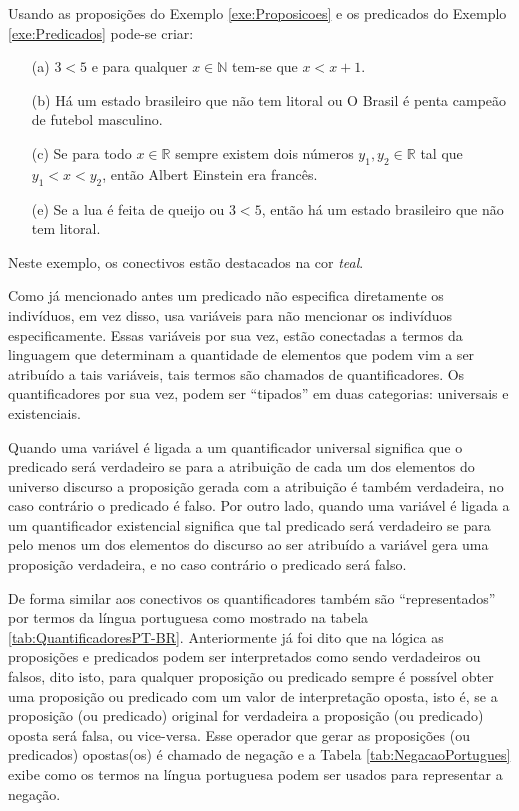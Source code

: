 \begin{exemplo}\label{exe:Conectivos}
	Usando as proposições do Exemplo \ref{exe:Proposicoes} e os predicados do Exemplo \ref{exe:Predicados} pode-se criar:
	\begin{itemize}
		\item[(a)] $3 < 5$ {\color{teal}e} para qualquer $x \in\mathbb{N}$ tem-se que $x < x + 1$.
		\item[(b)] Há um estado brasileiro que não tem litoral {\color{teal}ou} O Brasil é penta campeão de futebol masculino.
		\item[(c)] {\color{teal}Se} para todo $x \in \mathbb{R}$ sempre existem dois números $y_1, y_2 \in \mathbb{R}$ tal que $y_1 < x < y_2$, {\color{teal}então} Albert Einstein era francês.
		\item[(e)] {\color{teal}Se} a lua é feita de queijo {\color{teal}ou} $3 < 5$, {\color{teal}então} há um estado brasileiro que não tem litoral.
	\end{itemize}
	Neste exemplo, os conectivos estão destacados na cor \textit{{\color{teal} teal}}.
\end{exemplo}

Como já mencionado antes um predicado não especifica diretamente os indivíduos, em vez disso, usa variáveis para não mencionar os indivíduos especificamente. Essas variáveis por sua vez, estão conectadas a termos da linguagem que determinam a quantidade de elementos que podem vim a ser atribuído a tais variáveis, tais termos são chamados de quantificadores. Os quantificadores por sua vez, podem ser ``tipados'' em duas categorias: universais e existenciais.

Quando uma variável é ligada a um quantificador universal significa que o predicado será verdadeiro se para a atribuição de cada um dos elementos do universo discurso a proposição gerada com a atribuição é também verdadeira, no caso contrário o predicado é falso. Por outro lado, quando uma variável é ligada a um quantificador existencial significa que tal predicado será verdadeiro se para pelo menos um dos elementos do discurso ao ser atribuído a variável gera uma proposição verdadeira, e no caso contrário o predicado será falso.

De forma similar aos conectivos os quantificadores também são ``representados'' por termos da língua portuguesa como mostrado na tabela \ref{tab:QuantificadoresPT-BR}. Anteriormente já foi dito que na lógica as proposições e predicados podem ser interpretados como sendo verdadeiros ou falsos, dito isto, para qualquer proposição ou predicado sempre é possível obter uma proposição ou predicado com um valor de interpretação oposta, isto é, se a proposição (ou predicado) original for verdadeira a proposição (ou predicado) oposta será falsa, ou vice-versa. Esse operador que gerar as proposições (ou predicados) opostas(os) é chamado de negação e a Tabela \ref{tab:NegacaoPortugues} exibe como os termos na língua portuguesa podem ser usados para representar a negação.

